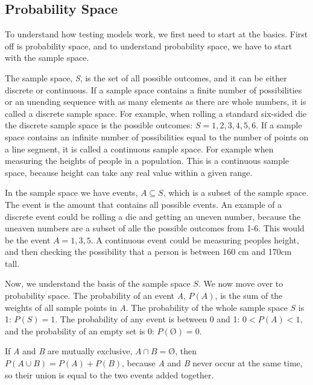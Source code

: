 \subsection{Probability Space}
To understand how testing models work, we first need to start at the basics. First off is probability space, and to understand probability space, we have to start with the sample space. \newline

\noindent The sample space, \textit{S}, is the set of all possible outcomes, and it can be either discrete or continuous. If a sample space contains a finite number of possibilities or an unending sequence with as many elements as there are whole numbers, it is called a discrete sample space. For example, when rolling a standard six-sided die the discrete sample space is the possible outcomes: $S={1,2,3,4,5,6}$. If a sample space contains an infinite number of possibilities equal to the number of points on a line segment, it is called a continuous sample space. For example when measuring the heights of people in a population. This is a continuous sample space, because height can take any real value within a given range.\newline

\noindent In the sample space we have events, $A\subseteq S$, which is a subset of the sample space. The event is the amount that contains all possible events. An example of a discrete event could be rolling a die and getting an uneven number, because the uneaven numbers are a subset of alle the possible outcomes from 1-6. This would be the event $A={1,3,5}$. A continuous event could be measuring peoples height, and then checking the possibility that a person is between 160 cm and 170cm tall.
\newline

\noindent Now, we understand the basis of the sample space $S$. We now move over to probability space. The probability of an event \textit{A}, $P(A)$, is the sum of the weights of all sample points in \textit{A}.
The probability of the whole sample space $S$ is 1: $P(S)=1$. The probability of any event is between 0 and 1: $0<P(A)<1$, and the probability of an empty set is 0: $P(Ø)=0$.
\newline
\newline

\noindent If \textit{A} and \textit{B} are mutually exclusive, $A \cap B=Ø$, then $P(A \cup B) = P(A)+P(B)$, because \textit{A} and \textit{B} never occur at the same time, so their union is equal to the two events added together. 
\newline

